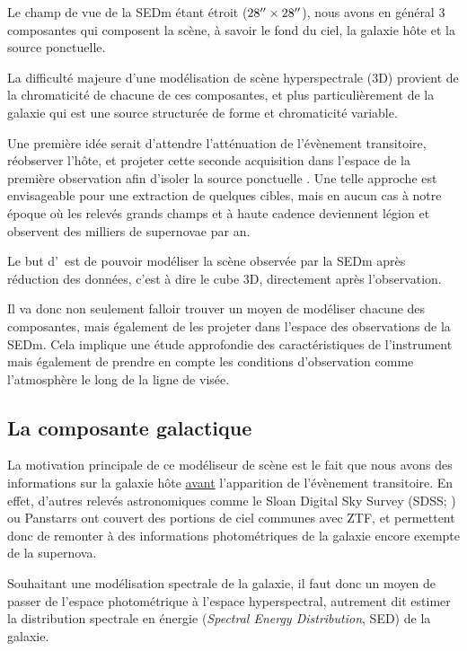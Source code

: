\documentclass[../main/main.tex]{subfiles}
\begin{document}
Le champ de vue de la SEDm étant étroit ($28^{\prime\prime}\times28^{\prime\prime}$), nous
avons en général $3$ composantes qui composent la
scène, à savoir le fond du ciel, la galaxie hôte et la source ponctuelle.

La difficulté majeure d'une modélisation de scène hyperspectrale (3D) provient de la chromaticité de chacune de ces
composantes, et plus particulièrement de la galaxie qui est une source
structurée de forme et chromaticité variable.

Une première idée serait d'attendre l'atténuation de l'évènement
transitoire, réobserver l'hôte, et projeter cette seconde acquisition
dans l'espace de la première observation afin d'isoler la source
ponctuelle \citep{Bongard2011}. Une telle approche est envisageable pour une extraction de
quelques cibles, mais en aucun cas à notre époque où les relevés grands
champs et à haute cadence deviennent légion et observent des milliers
de supernovae par an.

Le but d'\hypergal\ est de pouvoir modéliser la scène observée
par la SEDm après réduction des données, c'est à dire le cube 3D,
directement après l'observation.

Il va donc non seulement falloir trouver un moyen de modéliser chacune
des composantes, mais également de les projeter dans l'espace des
observations de la SEDm. Cela implique une étude approfondie des caractéristiques de
l'instrument mais également de prendre en compte les conditions
d'observation comme l'atmosphère le long de la ligne de visée.


\subsection{La composante galactique}

La motivation principale de ce modéliseur de scène est le fait que nous
avons des informations sur la galaxie hôte \underline{avant}
l'apparition de l'évènement transitoire. En effet, d'autres relevés
astronomiques comme le Sloan Digital Sky Survey (SDSS;
\citet{YorkSDSS2000}) ou Panstarrs \citep{ChambersPanstarrs} ont couvert
des portions de ciel communes avec ZTF, et permettent donc de remonter à
des informations photométriques de la galaxie encore exempte de la supernova.

Souhaitant une modélisation spectrale de la galaxie, il faut donc un
moyen de passer de l'espace photométrique à l'espace hyperspectral, autrement
dit estimer la distribution spectrale en énergie (\textit{Spectral Energy Distribution}, SED) de la galaxie. 
\end{document}

